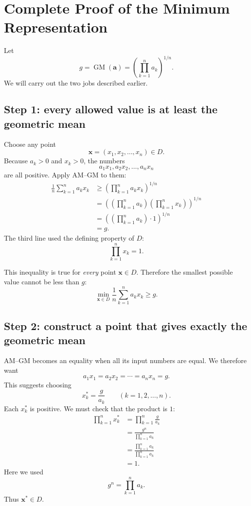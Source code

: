 \documentclass[11pt]{article}
\newcommand{\GM}{\operatorname{GM}}
\begin{document}
\section{Complete Proof of the Minimum Representation}

Let
\[
 g=\GM(\mathbf a)
 =\left(\prod_{k=1}^{n}a_k\right)^{1/n}.
\]
We will carry out the two jobs described earlier.

\subsection{Step 1: every allowed value is at least the geometric mean}

Choose any point
\[
 \mathbf x=(x_1,x_2,\ldots,x_n)\in D.
\]
Because $a_k>0$ and $x_k>0$, the numbers
\[
 a_1x_1,a_2x_2,\ldots,a_nx_n
\]
are all positive.  Apply AM--GM to them:
\begin{align*}
 \frac1n\sum_{k=1}^{n}a_kx_k
 &\ge
 \left(\prod_{k=1}^{n}a_kx_k\right)^{1/n}\\
 &=
 \left(
   \left(\prod_{k=1}^{n}a_k\right)
   \left(\prod_{k=1}^{n}x_k\right)
 \right)^{1/n}\\
 &=
 \left(
   \left(\prod_{k=1}^{n}a_k\right)\cdot1
 \right)^{1/n}\\
 &=g.
\end{align*}
The third line used the defining property of $D$:
\[
 \prod_{k=1}^{n}x_k=1.
\]

This inequality is true for \emph{every} point $\mathbf x\in D$.  Therefore the
smallest possible value cannot be less than $g$:
\begin{equation*}
 \min_{\mathbf x\in D}
 \frac1n\sum_{k=1}^{n}a_kx_k
 \ge g.
\tag{1}
\end{equation*}

\subsection{Step 2: construct a point that gives exactly the geometric mean}

AM--GM becomes an equality when all its input numbers are equal.  We therefore
want
\[
 a_1x_1=a_2x_2=\cdots=a_nx_n=g.
\]
This suggests choosing
\begin{equation*}
\boxed{
 x_k^*=\frac{g}{a_k}
 \qquad(k=1,2,\ldots,n).
}
\tag{2}
\end{equation*}
Each $x_k^*$ is positive.  We must check that the product is $1$:
\begin{align*}
 \prod_{k=1}^{n}x_k^*
 &=\prod_{k=1}^{n}\frac{g}{a_k}\\
 &=\frac{g^n}{\prod_{k=1}^{n}a_k}\\
 &=\frac{\prod_{k=1}^{n}a_k}
         {\prod_{k=1}^{n}a_k}\\
 &=1.
\end{align*}
Here we used
\[
 g^n=\prod_{k=1}^{n}a_k.
\]
Thus $\mathbf x^*\in D$.
\end{document}
